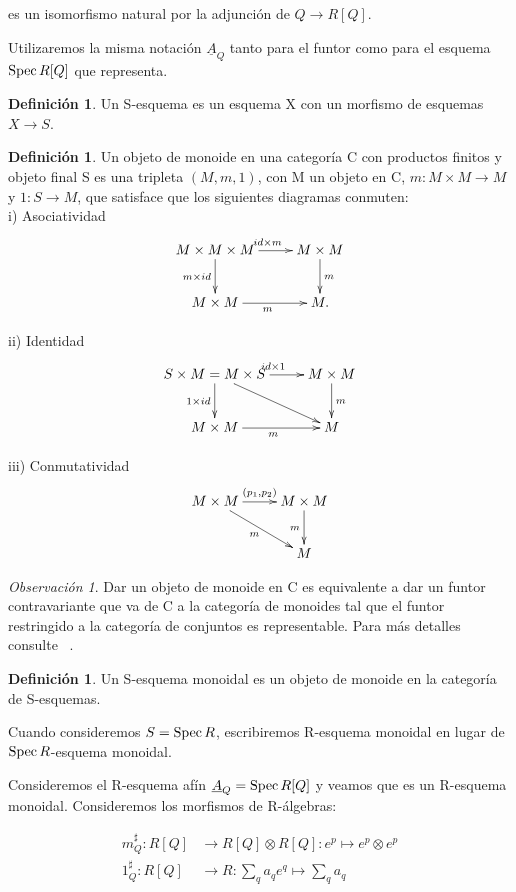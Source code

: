 \documentclass[12pt,spanish]{amsart}
\def\Spec{\mathop{\mbox{\normalfont Spec}}\nolimits}
\theoremstyle{definition}
\newtheorem{Def}[Theorem]{Definición}
\theoremstyle{remark}
\newtheorem{obs}[Theorem]{Observación}
\begin{document}
es un isomorfismo natural por la adjunción de $Q \to R[Q]$. 

Utilizaremos la misma notación $\underline{A}_{Q}$ tanto para el funtor como para el esquema $\Spec{R[Q]}$ que representa.

\begin{Def}
Un S-esquema es un esquema X con un morfismo de esquemas $X \to S$. 
\end{Def}


\begin{Def}
Un objeto de monoide en una categoría C con productos finitos y objeto final S es una tripleta $(M,m,1)$, con M un objeto en C, $m:M\times M \to M$  y $1:S \to M$, que satisface que los siguientes diagramas conmuten: \\
i) Asociatividad
$$\xymatrix{
M\times M\times M \ar[d]_{m\times id}  \ar[r]^{id\times m} & M\times M \ar[d]^{m} \\
M\times M \ar[r]_{m} & M.
}
$$

ii) Identidad
$$\xymatrix{
S\times M= M\times S \ar[d]_{1\times id} \ar[dr] \ar[r]^{id\times 1} & M\times M \ar[d]^{m} \\
M\times M \ar[r]_{m} & M
}
$$

iii) Conmutatividad
$$\xymatrix{
M\times M \ar[dr]_{m} \ar[r]^{(p_{1},p_{2})} & M\times M \ar[d]_{m}\\
& M 
}
$$
\end{Def}

\begin{obs}
Dar un objeto de monoide en C es equivalente a dar un funtor contravariante que va de C a la categoría de monoides tal que el funtor restringido a la categoría de conjuntos es representable. Para más detalles consulte ~\cite{cornell2013modular}. 
\end{obs}

\begin{Def}
Un S-esquema monoidal es un objeto de monoide en la categoría de S-esquemas. 
\end{Def}

Cuando consideremos $S=\Spec{R}$, escribiremos R-esquema monoidal en lugar de $\Spec{R}$-esquema monoidal.


Consideremos el R-esquema afín $\underline{A}_{Q}=\Spec{R[Q]}$ y veamos que es un R-esquema monoidal. Consideremos los morfismos de R-álgebras:

\begin{equation*}
\begin{split}
m_{Q}^{\sharp}:R[Q] &\to R[Q] \otimes R[Q]:e^{p} \mapsto e^{p}\otimes e^{p} \\
1_{Q}^{ \sharp}:R[Q] &\to R: \sum_{q} a_{q}e^{q} \mapsto \sum_{q}a_{q} 
\end{split}
\end{equation*}
\end{document}
